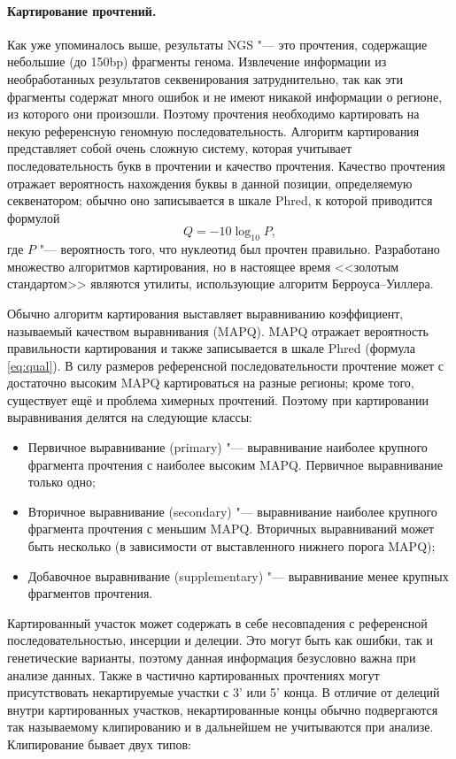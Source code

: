 \documentclass[a4paper,12pt]{article}
\begin{document}
\paragraph{Картирование прочтений.}
Как уже упоминалось выше, результаты NGS "--- это прочтения, содержащие небольшие (до 150bp) фрагменты генома.
Извлечение информации из необработанных результатов секвенирования затруднительно, так как эти фрагменты содержат много ошибок и не имеют никакой информации о регионе, из которого они произошли.
Поэтому прочтения необходимо картировать на некую референсную геномную последовательность.
Алгоритм картирования представляет собой очень сложную систему, которая учитывает последовательность букв в прочтении и качество прочтения.
Качество прочтения отражает вероятность нахождения буквы в данной позиции, определяемую секвенатором; обычно оно записывается в шкале Phred, к которой приводится формулой \begin{equation}Q = -10\log_{10}P,\label{eq:qual}\end{equation} где $P$ "--- вероятность того, что нуклеотид был прочтен правильно.
Разработано множество алгоритмов картирования, но в настоящее время <<золотым стандартом>> являются утилиты, использующие алгоритм Берроуса--Уиллера\cite{burrows}.

Обычно алгоритм картирования выставляет выравниванию коэффициент, называемый качеством выравнивания (MAPQ).
MAPQ отражает вероятность правильности картирования и также записывается в шкале Phred (формула \ref{eq:qual}).
В силу размеров референсной последовательности прочтение может с достаточно высоким MAPQ картироваться на разные регионы; кроме того, существует ещё и проблема химерных прочтений.
Поэтому при картировании выравнивания делятся на следующие классы:

\begin{itemize}
\item Первичное выравнивание (primary) "--- выравнивание наиболее крупного фрагмента прочтения с наиболее высоким MAPQ.
Первичное выравнивание только одно;
\item Вторичное выравнивание (secondary) "--- выравнивание наиболее крупного фрагмента прочтения с меньшим MAPQ.
Вторичных выравниваний может быть несколько (в зависимости от выставленного нижнего порога MAPQ);
\item Добавочное выравнивание (supplementary) "--- выравнивание менее крупных фрагментов прочтения.
\end{itemize}

Картированный участок может содержать в себе несовпадения с референсной последовательностью, инсерции и делеции.
Это могут быть как ошибки, так и генетические варианты, поэтому данная информация безусловно важна при анализе данных.
Также в частично картированных прочтениях могут присутствовать некартируемые участки с 3' или 5' конца.
В отличие от делеций внутри картированных участков, некартированные концы обычно подвергаются так называемому клипированию и в дальнейшем не учитываются при анализе.
Клипирование бывает двух типов:
\end{document}
